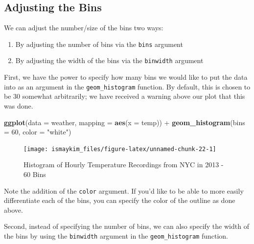 \documentclass[]{tufte-book}
\newenvironment{Shaded}{\begin{snugshade}}{\end{snugshade}}
\newcommand{\KeywordTok}[1]{\textcolor[rgb]{0.13,0.29,0.53}{\textbf{{#1}}}}
\newcommand{\DataTypeTok}[1]{\textcolor[rgb]{0.13,0.29,0.53}{{#1}}}
\newcommand{\DecValTok}[1]{\textcolor[rgb]{0.00,0.00,0.81}{{#1}}}
\newcommand{\StringTok}[1]{\textcolor[rgb]{0.31,0.60,0.02}{{#1}}}
\newcommand{\NormalTok}[1]{{#1}}
\providecommand{\tightlist}{%
  \setlength{\itemsep}{0pt}\setlength{\parskip}{0pt}}
\begin{document}
\subsection{Adjusting the Bins}\label{adjustbins}

We can adjust the number/size of the bins two ways:

\begin{enumerate}
\def\labelenumi{\arabic{enumi}.}
\tightlist
\item
  By adjusting the number of bins via the \texttt{bins} argument
\item
  By adjusting the width of the bins via the \texttt{binwidth} argument
\end{enumerate}

First, we have the power to specify how many bins we would like to put
the data into as an argument in the \texttt{geom\_histogram} function.
By default, this is chosen to be 30 somewhat arbitrarily; we have
received a warning above our plot that this was done.

\begin{Shaded}
\begin{Highlighting}[]
\KeywordTok{ggplot}\NormalTok{(}\DataTypeTok{data =} \NormalTok{weather, }\DataTypeTok{mapping =} \KeywordTok{aes}\NormalTok{(}\DataTypeTok{x =} \NormalTok{temp)) +}
\StringTok{  }\KeywordTok{geom_histogram}\NormalTok{(}\DataTypeTok{bins =} \DecValTok{60}\NormalTok{, }\DataTypeTok{color =} \StringTok{"white"}\NormalTok{)}
\end{Highlighting}
\end{Shaded}

\begin{figure}

{\centering \texttt{[image: ismaykim\_files/figure-latex/unnamed-chunk-22-1]} 

}

\caption[Histogram of Hourly Temperature Recordings from NYC in 2013 - 60 Bins]{Histogram of Hourly Temperature Recordings from NYC in 2013 - 60 Bins}\label{fig:unnamed-chunk-22}
\end{figure}

Note the addition of the \texttt{color} argument. If you'd like to be
able to more easily differentiate each of the bins, you can specify the
color of the outline as done above.

Second, instead of specifying the number of bins, we can also specify
the width of the bins by using the \texttt{binwidth} argument in the
\texttt{geom\_histogram} function.
\end{document}
